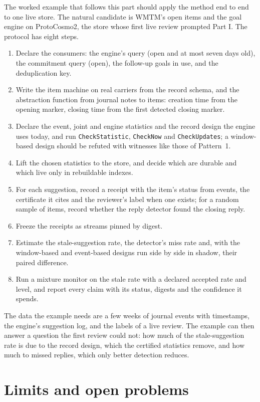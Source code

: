 \documentclass[11pt]{article}
\newcommand{\code}[1]{\texttt{#1}}
\theoremstyle{definition}
\theoremstyle{plain}
\begin{document}
The worked example that follows this part should apply the method end to end to one live store. The
natural candidate is WMTM's open items and the goal engine on ProtoCosmo2, the store whose first
live review prompted Part I. The protocol has eight steps.
\begin{enumerate}
\item Declare the consumers: the engine's query (open and at most seven days old), the commitment
  query (open), the follow-up goals in use, and the deduplication key.
\item Write the item machine on real carriers from the record schema, and the abstraction function
  from journal notes to items: creation time from the opening marker, closing time from the first
  detected closing marker.
\item Declare the event, joint and engine statistics and the record design the engine uses today,
  and run \code{CheckStatistic}, \code{CheckNow} and \code{CheckUpdates}; a window-based design
  should be refuted with witnesses like those of Pattern~1.
\item Lift the chosen statistics to the store, and decide which are durable and which live only in
  rebuildable indexes.
\item For each suggestion, record a receipt with the item's status from events, the certificate it
  cites and the reviewer's label when one exists; for a random sample of items, record whether the
  reply detector found the closing reply.
\item Freeze the receipts as streams pinned by digest.
\item Estimate the stale-suggestion rate, the detector's miss rate and, with the window-based and
  event-based designs run side by side in shadow, their paired difference.
\item Run a mixture monitor on the stale rate with a declared accepted rate and level, and report
  every claim with its status, digests and the confidence it spends.
\end{enumerate}
The data the example needs are a few weeks of journal events with timestamps, the engine's
suggestion log, and the labels of a live review. The example can then answer a question the first
review could not: how much of the stale-suggestion rate is due to the record design, which the
certified statistics remove, and how much to missed replies, which only better detection reduces.

\section{Limits and open problems}\label{sec:limits}
\end{document}
